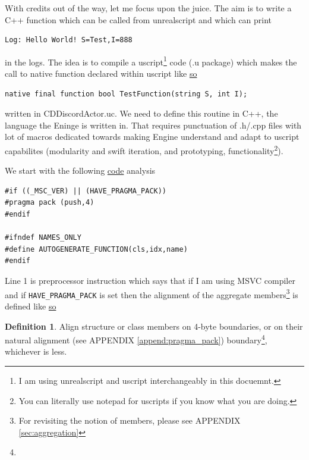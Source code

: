 \documentclass{article}
\theoremstyle{definition}
\newtheorem{definition}{Definition}[section]
\newcommand{\FileColor}[1]{{\color{Purple} #1}}
\begin{document}
With credits out of the way, let me focus upon the juice.  The aim is to write a C++ function which can be called from unrealscript  and which can print

\lstset{language=[5.0]Lua}
\begin{lstlisting}[frame=single]
Log: Hello World! S=Test,I=888
\end{lstlisting}

in the logs.  The idea is to compile a uscript\footnote{I am using unrealscript and uscript interchangeably in this docuemnt.} code (.u package) which makes the call to native function 
declared within uscript like \href{https://github.com/ravimohan1991/ChatDiamond/blob/f7950b2591b93a54600459ec58d7ddf57fe9218d/Classes/CDDiscordActor.uc#L43}{so}

\lstset{language=Java}
\begin{lstlisting}[frame=single]
native final function bool TestFunction(string S, int I);
\end{lstlisting}

written in \FileColor{CDDiscordActor.uc}.  We need to define this routine in C++, the language the Eninge is written in.  That requires punctuation of .h/.cpp files with lot of macros dedicated towards
making Engine understand and adapt to uscript capabilites (modularity and swift iteration, and prototyping, functionality\footnote{You can literally use notepad for uscripts if you know what you are doing.}).

We start with the following \href{https://github.com/ravimohan1991/ChatDiamond/blob/f7950b2591b93a54600459ec58d7ddf57fe9218d/UTNativeEssentials/ChatDiamond/Inc/ActorNativeClass.h}{code} analysis
\lstset{language=C++}
\begin{lstlisting}[frame=single]
#if ((_MSC_VER) || (HAVE_PRAGMA_PACK))
#pragma pack (push,4)
#endif

#ifndef NAMES_ONLY
#define AUTOGENERATE_FUNCTION(cls,idx,name)
#endif
\end{lstlisting}

Line 1 is preprocessor instruction which says that if I am using MSVC compiler and if \texttt{HAVE\_PRAGMA\_PACK} is set then the alignment of the aggregate members\footnote{For revisiting the notion of 
members, please see APPENDIX \ref{sec:aggregation}} is defined like \href{https://www.ibm.com/docs/en/zos/2.1.0?topic=descriptions-pragma-pack}{so}

\begin{definition}
Align structure or class members on 4-byte boundaries, or on their natural alignment (see APPENDIX \ref{append:pragma_pack}) boundary\footnote{}, whichever is less.
\end{definition}
\end{document}
